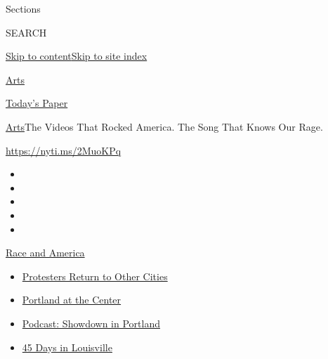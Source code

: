 Sections

SEARCH

\protect\hyperlink{site-content}{Skip to
content}\protect\hyperlink{site-index}{Skip to site index}

\href{https://www.nytimes3xbfgragh.onion/section/arts}{Arts}

\href{https://myaccount.nytimes3xbfgragh.onion/auth/login?response_type=cookie\&client_id=vi}{}

\href{https://www.nytimes3xbfgragh.onion/section/todayspaper}{Today's
Paper}

\href{/section/arts}{Arts}\textbar{}The Videos That Rocked America. The
Song That Knows Our Rage.

\url{https://nyti.ms/2MuoKPq}

\begin{itemize}
\item
\item
\item
\item
\item
\end{itemize}

\href{https://www.nytimes3xbfgragh.onion/news-event/george-floyd-protests-minneapolis-new-york-los-angeles?action=click\&pgtype=Article\&state=default\&region=TOP_BANNER\&context=storylines_menu}{Race
and America}

\begin{itemize}
\tightlist
\item
  \href{https://www.nytimes3xbfgragh.onion/2020/07/26/us/protests-portland-seattle-trump.html?action=click\&pgtype=Article\&state=default\&region=TOP_BANNER\&context=storylines_menu}{Protesters
  Return to Other Cities}
\item
  \href{https://www.nytimes3xbfgragh.onion/2020/07/24/us/portland-oregon-protests-white-race.html?action=click\&pgtype=Article\&state=default\&region=TOP_BANNER\&context=storylines_menu}{Portland
  at the Center}
\item
  \href{https://www.nytimes3xbfgragh.onion/2020/07/23/podcasts/the-daily/portland-protests.html?action=click\&pgtype=Article\&state=default\&region=TOP_BANNER\&context=storylines_menu}{Podcast:
  Showdown in Portland}
\item
  \href{https://www.nytimes3xbfgragh.onion/interactive/2020/07/16/us/black-lives-matter-protests-louisville-breonna-taylor.html?action=click\&pgtype=Article\&state=default\&region=TOP_BANNER\&context=storylines_menu}{45
  Days in Louisville}
\end{itemize}

